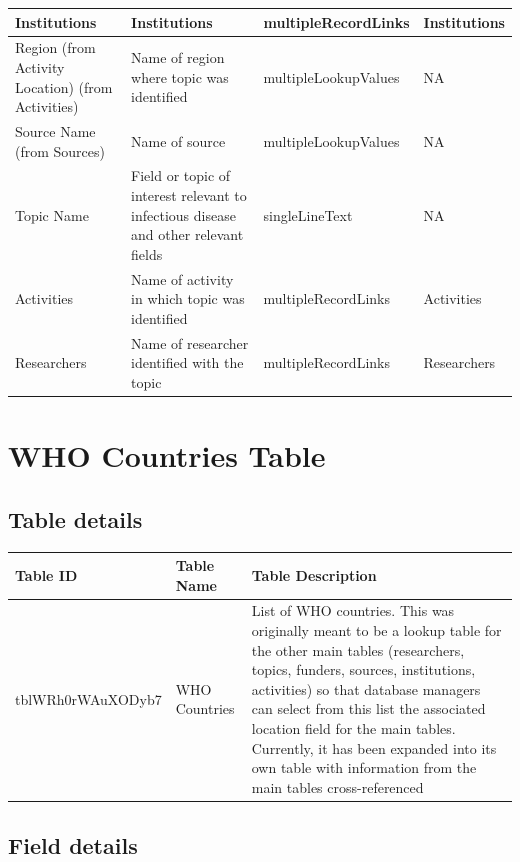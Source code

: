 \documentclass[
]{book}
\begin{document}
\begin{table}
\begin{tabular}{l|l|l|l}
\hline
Institutions & Institutions & multipleRecordLinks & Institutions\\
\hline
Region (from Activity Location) (from Activities) & Name of region where topic was identified & multipleLookupValues & NA\\
\hline
Source Name (from Sources) & Name of source & multipleLookupValues & NA\\
\hline
Topic Name & Field or topic of interest relevant to infectious disease and other relevant fields & singleLineText & NA\\
\hline
Activities & Name of activity in which topic was identified & multipleRecordLinks & Activities\\
\hline
Researchers & Name of researcher identified with the topic & multipleRecordLinks & Researchers\\
\hline
\end{tabular}
\end{table}

\hypertarget{who-countries-table}{%
\section{WHO Countries Table}\label{who-countries-table}}

\hypertarget{table-details-10}{%
\subsection{Table details}\label{table-details-10}}

\begin{table}
\centering
\begin{tabular}{l|l|l}
\hline
\textbf{Table ID} & \textbf{Table Name} & \textbf{Table Description}\\
\hline
tblWRh0rWAuXODyb7 & WHO Countries & List of WHO countries. This was originally meant to be a lookup table for the other main tables (researchers, topics, funders, sources, institutions, activities) so that database managers can select from this list the associated location field for the main tables. Currently, it has been expanded into its own table with information from the main tables cross-referenced\\
\hline
\end{tabular}
\end{table}

\hypertarget{field-details-7}{%
\subsection{Field details}\label{field-details-7}}
\end{document}
